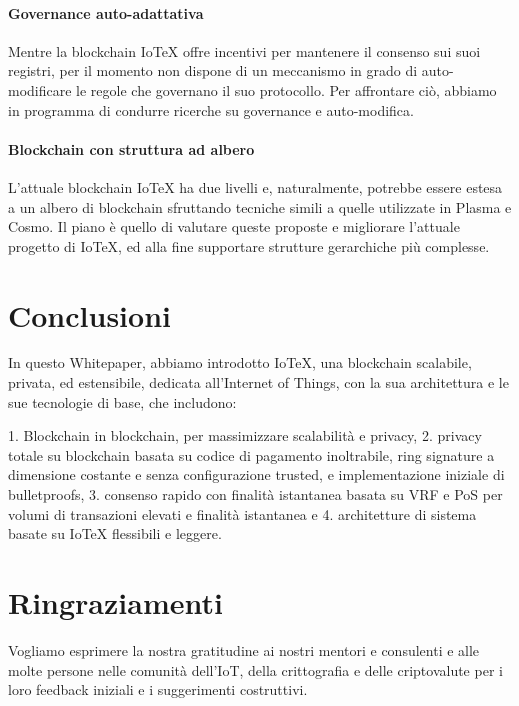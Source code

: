 \paragraph{Governance auto-adattativa}
Mentre la blockchain IoTeX offre incentivi per mantenere il consenso sui suoi registri, per il momento non dispone di un meccanismo in grado di auto-modificare le regole che governano il suo protocollo. Per affrontare ciò, abbiamo in programma di condurre ricerche su governance e auto-modifica.

\paragraph{Blockchain con struttura ad albero}
L'attuale blockchain IoTeX ha due livelli e, naturalmente, potrebbe essere estesa a un albero di blockchain sfruttando tecniche simili a quelle utilizzate in Plasma e Cosmo. Il piano è quello di valutare queste proposte e migliorare l'attuale progetto di IoTeX, ed alla fine supportare strutture gerarchiche più complesse.

\section{Conclusioni}
In questo Whitepaper, abbiamo introdotto IoTeX, una blockchain scalabile, privata, ed estensibile, dedicata all'Internet of Things, con la sua architettura e le sue tecnologie di base, che includono:

1. Blockchain in blockchain, per massimizzare scalabilità e privacy, 2. privacy totale su blockchain basata su codice di pagamento inoltrabile, ring signature a dimensione costante e senza configurazione trusted, e implementazione iniziale di bulletproofs, 3. consenso rapido con finalità istantanea basata su VRF e PoS per volumi di transazioni elevati e finalità istantanea e 4. architetture di sistema basate su IoTeX flessibili e leggere.

\section{Ringraziamenti}
Vogliamo esprimere la nostra gratitudine ai nostri mentori e consulenti e alle molte persone nelle comunità dell'IoT, della crittografia e delle criptovalute per i loro feedback iniziali e i suggerimenti costruttivi.